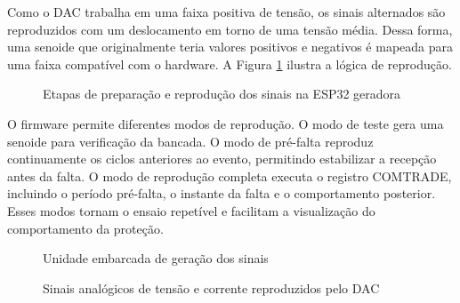 Como o DAC trabalha em uma faixa positiva de tensão, os sinais alternados são reproduzidos com um deslocamento em torno de uma tensão média. Dessa forma, uma senoide que originalmente teria valores positivos e negativos é mapeada para uma faixa compatível com o hardware. A Figura \ref{fig:geracao-sinais} ilustra a lógica de reprodução.

\begin{figure}[H]
  \centering
  \caption{Etapas de preparação e reprodução dos sinais na ESP32 geradora}
  \label{fig:geracao-sinais}
\end{figure}

O firmware permite diferentes modos de reprodução. O modo de teste gera uma senoide para verificação da bancada. O modo de pré-falta reproduz continuamente os ciclos anteriores ao evento, permitindo estabilizar a recepção antes da falta. O modo de reprodução completa executa o registro COMTRADE, incluindo o período pré-falta, o instante da falta e o comportamento posterior. Esses modos tornam o ensaio repetível e facilitam a visualização do comportamento da proteção.

\begin{figure}[H]
  \centering
  \caption{Unidade embarcada de geração dos sinais}
  \label{fig:unidade-geradora}
\end{figure}

\begin{figure}[H]
  \centering
  \caption{Sinais analógicos de tensão e corrente reproduzidos pelo DAC}
  \label{fig:sinais-reproduzidos}
\end{figure}


